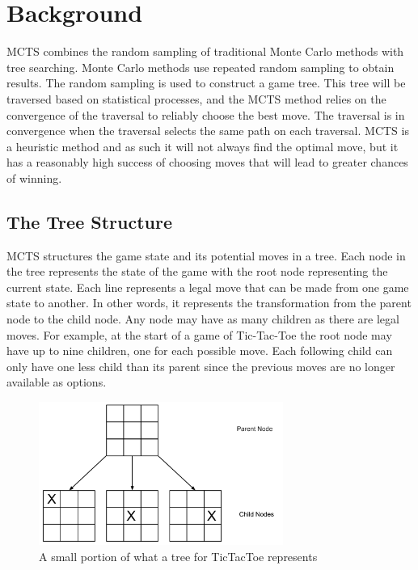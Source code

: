 \documentclass{sig-alternate}
\begin{document}
\section{Background}
MCTS combines the random sampling of traditional Monte Carlo methods with tree searching. Monte Carlo methods use repeated random sampling to obtain results. The random sampling is used to construct a game tree. This tree will be traversed based on statistical processes, and the MCTS method relies on the convergence of the traversal to reliably choose the best move. The traversal is in convergence when the traversal selects the same path on each traversal. MCTS is a heuristic method and as such it will not always find the optimal move, but it has a reasonably high success of choosing moves that will lead to greater chances of winning.
\subsection{The Tree Structure}\label{sec:TreeStructure}
MCTS structures the game state and its potential moves in a tree. Each node in the tree represents the state of the game with the root node representing the current state. Each line represents a legal move that can be made from one game state to another. In other words, it represents the transformation from the parent node to the child node. Any node may have as many children as there are legal moves. For example, at the start of a game of Tic-Tac-Toe the root node may have up to nine children, one for each possible move. Each following child can only have one less child than its parent since the previous moves are no longer available as options.

\begin{figure}[h]
\includegraphics[width=8cm]{TicTacToeTree.pdf}
\centering
\caption{A small portion of what a tree for TicTacToe represents}
\label{fig:TicTacToe}
\end{figure}
\end{document}
